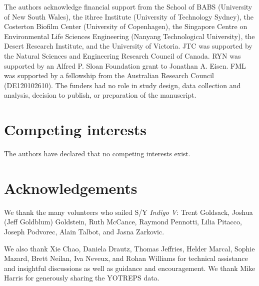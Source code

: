 \begin{refsection}
The authors acknowledge financial support from the School of BABS (University of New South Wales), the ithree Institute (University of Technology Sydney), the Costerton Biofilm Center (University of Copenhagen), the Singapore Centre on Environmental Life Sciences Engineering (Nanyang Technological University), the Desert Research Institute, and the University of Victoria. JTC was supported by the Natural Sciences and Engineering Research Council of Canada. RYN was supported by an Alfred P. Sloan Foundation grant to Jonathan A. Eisen. FML was supported by a fellowship from the Australian Research Council (DE120102610). The funders had no role in study design, data collection and analysis, decision to publish, or preparation of the manuscript.

\section{Competing interests}

The authors have declared that no competing interests exist.

\section{Acknowledgements}

We thank the many volunteers who sailed S/Y {\em Indigo V}: Trent Goldsack, Joshua (Jeff Goldblum) Goldstein, Ruth McCance, Raymond Pennotti, Lilia Pitacco, Joseph Podvorec, Alain Talbot, and Jasna Zarkovic.

We also thank Xie Chao, Daniela Drautz, Thomas Jeffries, Helder Marcal, Sophie Mazard, Brett Neilan, Iva Neveux, and Rohan Williams for technical assistance and insightful discussions as well as guidance and encouragement. We thank Mike Harris for generously sharing the YOTREPS data.


\printbibliography[heading=subbibliography]

\end{refsection}
